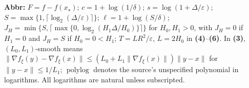 \begin{table}[tp]
\begin{threeparttable}
\begin{tabularx}{\linewidth}{@{}>{\raggedright\arraybackslash}p{0.20\linewidth}>{\raggedright\arraybackslash}p{0.32\linewidth}>{\raggedright\arraybackslash}p{0.25\linewidth}>{\raggedright\arraybackslash}X@{}}
\bottomrule
\end{tabularx}
\begin{tablenotes}[flushleft]\footnotesize
\item[] \textbf{Abbr:} $F=f-f(x_\star)$; $c=1+\log(1/\delta)$; $s=\log(1+\Delta/\varepsilon)$; $S=\max\{1,\lceil\log_2(\Delta/\varepsilon)\rceil\}$; $\ell=1+\log(S/\delta)$; $J_H=\min\{S,\lceil\max\{0,\log_2(H_1\Delta/H_0)\}\rceil\}$ for $H_0,H_1>0$, with $J_H=0$ if $H_1=0$ and $J_H=S$ if $H_0=0<H_1$; $T=LR^2/\varepsilon$, $L=2H_0$ in \textbf{(4)}--\textbf{(6)}. In \textbf{(3)}, $(L_0,L_1)$-smooth means $\|\nabla f_\xi(y)-\nabla f_\xi(x)\|\le(L_0+L_1\|\nabla f_\xi(x)\|)\|y-x\|$ for $\|y-x\|\le1/L_1$; $\operatorname{polylog}$ denotes the source's unspecified polynomial in logarithms. All logarithms are natural unless subscripted.
\end{tablenotes}
\end{threeparttable}
\end{table}
\clearpage
